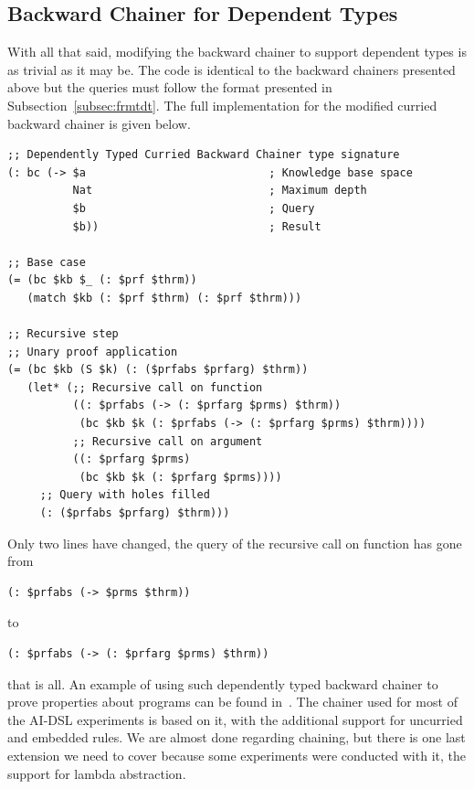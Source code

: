 \documentclass[]{report}
\begin{document}
\subsection{Backward Chainer for Dependent Types}

With all that said, modifying the backward chainer to support
dependent types is as trivial as it may be.  The code is identical to
the backward chainers presented above but the queries must follow the
format presented in Subsection~\ref{subsec:frmtdt}.  The full
implementation for the modified curried backward chainer is given
below.
\begin{verbatim}
;; Dependently Typed Curried Backward Chainer type signature
(: bc (-> $a                            ; Knowledge base space
          Nat                           ; Maximum depth
          $b                            ; Query
          $b))                          ; Result

;; Base case
(= (bc $kb $_ (: $prf $thrm))
   (match $kb (: $prf $thrm) (: $prf $thrm)))

;; Recursive step
;; Unary proof application
(= (bc $kb (S $k) (: ($prfabs $prfarg) $thrm))
   (let* (;; Recursive call on function
          ((: $prfabs (-> (: $prfarg $prms) $thrm))
           (bc $kb $k (: $prfabs (-> (: $prfarg $prms) $thrm))))
          ;; Recursive call on argument
          ((: $prfarg $prms)
           (bc $kb $k (: $prfarg $prms))))
     ;; Query with holes filled
     (: ($prfabs $prfarg) $thrm)))
\end{verbatim}
Only two lines have changed, the query of the recursive call on
function has gone from
\begin{verbatim}
(: $prfabs (-> $prms $thrm))
\end{verbatim}
to
\begin{verbatim}
(: $prfabs (-> (: $prfarg $prms) $thrm))
\end{verbatim}
that is all.  An example of using such dependently typed backward
chainer to prove properties about programs can be found
in~\cite{ChainingProgramProp}.  The chainer used for most of the
AI-DSL experiments is based on it, with the additional support for
uncurried and embedded rules.  We are almost done regarding chaining,
but there is one last extension we need to cover because some
experiments were conducted with it, the support for lambda
abstraction.
\end{document}
